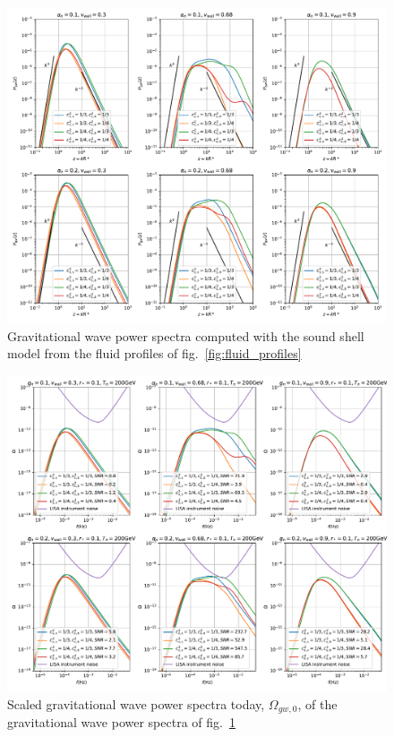 \begin{figure}[ht!]
\centering
\includegraphics[width=\textwidth]{fig/const_cs_gw.pdf}
\caption{Gravitational wave power spectra computed with the sound shell model from the fluid profiles of fig.~\ref{fig:fluid_profiles}}
\label{fig:gw_spectra}
\end{figure}

\begin{figure}[ht!]
\centering
\includegraphics[width=\textwidth]{fig/const_cs_gw_omgw0.pdf}
\caption{Scaled gravitational wave power spectra today, $\Omega_{gw,0}$, of the gravitational wave power spectra of fig.~\ref{fig:gw_spectra}}
\label{fig:omgw0}
\end{figure}

